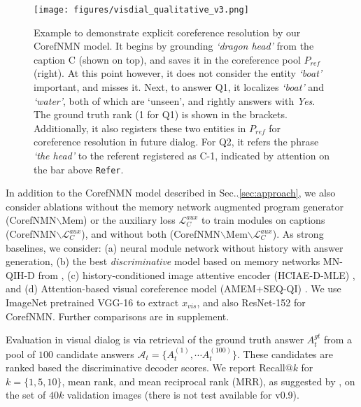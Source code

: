 \documentclass[runningheads]{llncs}
\makeatletter
\DeclareRobustCommand\onedot{\futurelet\@let@token\@onedot}
\def\@onedot{\ifx\@let@token.\else.\null\fi\xspace}
\def\Sec{Sec\onedot}
\newcommand{\nmn}{CorefNMN\xspace}
\newcommand{\myparagraph}[1]{\vspace{0pt}\noindent{\bf #1}}
\makeatother
\begin{document}
\begin{figure}[t]
	\centering
    \texttt{[image: figures/visdial\_qualitative\_v3.png]}
    \caption{
    Example to demonstrate explicit coreference resolution by our \nmn model.
    It begins by grounding \textit{`dragon head'} from the caption C
    (shown on top), and saves it in the coreference pool $P_{ref}$ (right).
    At this point however, it does not consider the entity \textit{`boat'} 
    important, and misses it.
    Next, to answer Q1, it localizes \textit{`boat'} and \textit{`water'},
    both of which are `unseen', and rightly answers with \textit{Yes}.
    The ground truth rank (1 for Q1) is shown in the brackets.
    Additionally, it also registers these two entities in $P_{ref}$ for 
    coreference resolution in future dialog.
    For Q2, it refers the phrase \textit{`the head'} to the referent registered
    as C-1, indicated by attention on the bar above \texttt{Refer}.}
    \label{fig:visdial_qualitative}
\end{figure} 

\myparagraph{Models and baselines.}
In addition to the \nmn model described in \Sec\ref{sec:approach}, 
we also consider ablations without the memory network augmented
program generator (\nmn{}$\backslash$Mem) or the auxiliary loss 
$\mathcal{L}_C^{aux}$ to train modules on captions 
(\nmn{}$\backslash\mathcal{L}_C^{aux}$), and without both
(\nmn{}$\backslash$Mem$\backslash\mathcal{L}_C^{aux}$).
As strong baselines, we consider: 
(a) neural module network without history \cite{hu2017learning} with answer
generation,
(b) the best \textit{discriminative} model based on memory networks MN-QIH-D 
from \cite{visdial}, (c) history-conditioned image attentive encoder (HCIAE-D-MLE) \cite{lu2017best},
and
(d) Attention-based visual coreference model (AMEM+SEQ-QI) \cite{paul2017visual}.
We use ImageNet pretrained VGG-16 \cite{simonyan_iclr15} to extract $x_{vis}$,
and also ResNet-152 \cite{he16cvpr} for \nmn{}.
Further comparisons are in supplement.

\myparagraph{Evaluation.}
Evaluation in visual dialog is via retrieval of the ground truth answer 
$A^{gt}_t$ from a pool of $100$ candidate answers 
$\mathcal{A}_t = \{A_t^{(1)}, \cdots A_t^{(100)}\}$.
These candidates are ranked based the discriminative decoder scores.
We report Recall$@k$ for $k=\{1, 5, 10\}$, mean rank, and mean reciprocal rank 
(MRR), as suggested by \cite{visdial},
on the set of $40k$ validation images (there is not test available for v0.9).
\end{document}
